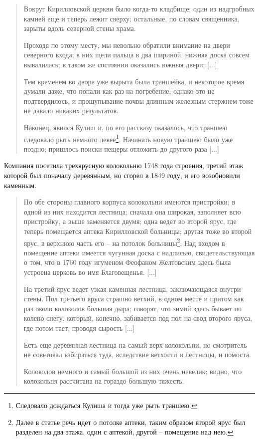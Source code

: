 \begin{quotation}
Вокруг Кирилловской церкви было когда-то кладбище; один из надгробных камней еще и теперь лежит сверху; остальные, по словам священника, зарыты вдоль северной стены храма.

Проходя по этому месту, мы невольно обратили внимание на двери северного входа; в них щели пальца в два шириной, нижняя доска совсем вывалилась; в таком же состоянии оказались южныя двери; [...] 

Тем временем во дворе уже вырыта была траншейка, и некоторое время думали даже, что попали как раз на погребение; однако это не подтвердилось, и прощупывание почвы длинным железным стержнем тоже не давало никаких результатов.

Наконец, явился Кулиш и, по его рассказу оказалось, что траншею следовало рыть немного левее\footnote{Следовало дождаться Кулиша и тогда уже рыть траншею.}. Начинать новую траншею было уже поздно; пришлось поиски пещеры отложить до другого раза [...]
\end{quotation}

Компания посетила трехярусную колокольню 1748 года строения, третий этаж которой был поначалу деревянным, но сгорел в 1849 году, и его возобновили каменным.

\begin{quotation}
По обе стороны главного корпуса колокольни имеются пристройки; в одной из них находится лестница; сначала она широкая, заполняет всю пристройку, а выше заменяется двумя; одна ведет во второй ярус, где теперь помещается аптека Кирилловской больницы; другая тоже во второй ярус, в верхнюю часть его – на потолок больницы\footnote{Далее в статье речь идет о потолке аптеки, таким образом второй ярус был разделен на два этажа, один с аптекой, другой – помещение над нею.}. Над входом в помещение аптеки имеется чугунная доска с надписью, свидетельствующая о том, что в 1760 году игуменом Феофаном Желтовским здесь была устроена церковь во имя Благовещенья. [...]

На третий ярус ведет узкая каменная лестница, заключающаяся внутри стены. Пол третьего яруса страшно ветхий, в одном месте и притом как раз около колоколов большая дыра; говорят, что зимой здесь бывает по колено снегу, который, конечно, забивается под пол на свод второго яруса, где потом тает, проводя сырость [...]

Есть еще деревянная лестница на самый верх колокольни, но смотритель не советовал взбираться туда, вследствие ветхости и лестницы, и помоста. 

Колоколов немного и самый большой из них очень невелик; видно, что колокольня рассчитана на гораздо большую тяжесть.
\end{quotation}

